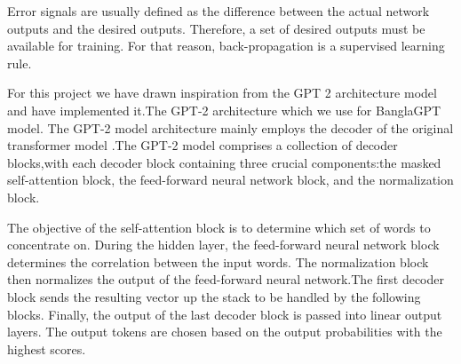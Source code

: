 Error signals are usually defined as the difference between the actual network outputs and the desired outputs. Therefore, a set of desired outputs must be available for training. For that reason, back-propagation is a supervised learning rule.

For this project we have drawn inspiration from the GPT 2 architecture model and have implemented it.The GPT-2 architecture which we use for BanglaGPT model. The GPT-2 model architecture mainly employs the decoder of the original transformer model .The GPT-2 model comprises a collection of decoder blocks,with each decoder block containing three crucial components:the masked self-attention block, the feed-forward neural network block, and the normalization block.

The objective of the self-attention block is to determine which set of words to concentrate on. During the hidden layer, the feed-forward neural network block determines the correlation between the input words. The normalization block then normalizes the output of the feed-forward neural network.The first decoder block sends the resulting vector up the stack to be handled by the following blocks. Finally, the output of the last decoder block is passed into linear output layers. The output tokens are chosen based on the output probabilities with the highest scores.
